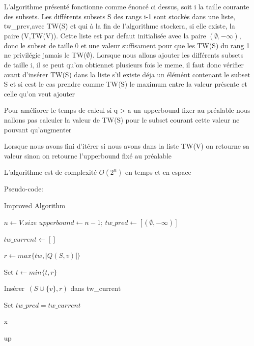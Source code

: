 \documentclass[a4paper, 12pt]{article}
\begin{document}
L'algorithme présenté fonctionne comme énoncé ci dessus, soit i la taille courante des subsets. 
Les différents subsets S des rangs i-1 sont stockés dans une liste, tw\_prev,avec TW(S) et qui à la fin de l'algorithme stockera, si elle existe, la paire
(V,TW(V)). Cette liste est par defaut initialisée avec la paire
$(\emptyset,-\infty)$, donc le subset de taille 0 et une valeur suffisament pour que les TW(S) du rang 1 ne privilégie jamais le TW($\emptyset$).
Lorsque nous allons ajouter les différents subsets de taille i, il se peut qu'on obtiennet plusieurs fois le meme, il faut donc vérifier avant d'insérer TW(S) dans la liste s'il existe déja un élémént contenant le subset S et si cest le cas prendre comme TW(S) le maximum entre la valeur présente et celle qu'on veut ajouter

Pour améliorer le temps de calcul si q > a un upperbound fixer au préalable
nous nallons pas calculer la valeur de TW(S) pour le subset courant cette 
valeur ne pouvant qu'augmenter

Lorsque nous avons fini d'itérer si nous avons dans la liste TW(V) on retourne sa valeur
sinon on retourne l'upperbound fixé au préalable

L'algorithme est de complexité $O(2^n)$ en temps et en espace


Pseudo-code:

\begin{algorithm}[hbt!]
\caption{Improved Algorithm}\label{alg:twdp}
\begin{algorithmic}
  \State $n \gets V.size$
  \State $upperbound \gets n-1$;
  \State $tw\_pred \gets [(\emptyset, -\infty)] $
   \do

    \State $tw\_current \gets []$

     \do

       \do

            \State $r \gets max\{tw, |Q(S,v)|\}$



              \State Set $t \gets min\{t,r\}$ 

            \Else

              \State Insérer\ $(S \cup \{v\}, r)$ dans tw\_current
            \EndIf
            
          \EndIf
      \EndFor
    \EndFor
    \State Set $tw\_pred = tw\_current$
  \EndFor


    \Return x
  \Else
  
   \Return up
  \EndIf
  
\end{algorithmic}
\end{algorithm}
\end{document}
